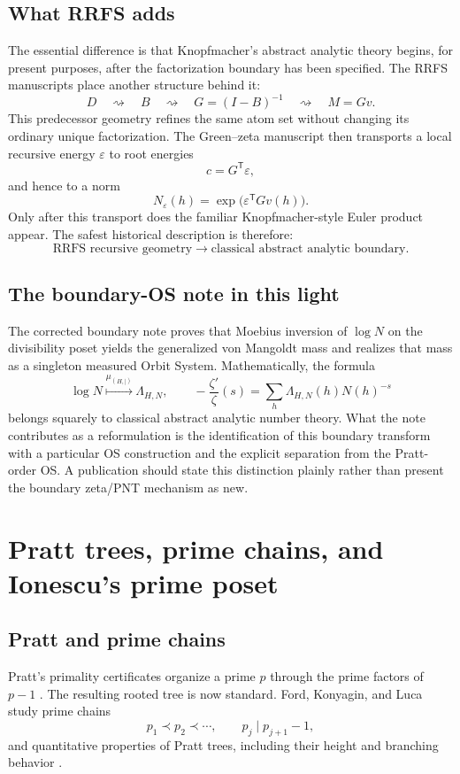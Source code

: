 \documentclass[11pt]{article}
\begin{document}
\subsection{What RRFS adds}
The essential difference is that Knopfmacher's abstract analytic theory begins, for present purposes, after the factorization boundary has been specified. The RRFS manuscripts place another structure behind it:
\[
 D\quad\rightsquigarrow\quad B\quad\rightsquigarrow\quad
 G=(I-B)^{-1}\quad\rightsquigarrow\quad M=Gv.
\]
This predecessor geometry refines the same atom set without changing its ordinary unique factorization. The Green--zeta manuscript then transports a local recursive energy $\varepsilon$ to root energies
\[
 c=G^{\mathsf T}\varepsilon,
\]
and hence to a norm
\[
 N_\varepsilon(h)=\exp\bigl(\varepsilon^{\mathsf T}Gv(h)\bigr).
\]
Only after this transport does the familiar Knopfmacher-style Euler product appear. The safest historical description is therefore:
\[
 \boxed{\text{RRFS recursive geometry}\longrightarrow
 \text{classical abstract analytic boundary}.}
\]

\subsection{The boundary-OS note in this light}
The corrected boundary note \cite{LekaBoundary} proves that Moebius inversion of $\log N$ on the divisibility poset yields the generalized von Mangoldt mass and realizes that mass as a singleton measured Orbit System. Mathematically, the formula
\[
 \log N\overset{\mu_{(H,\mid)}}{\longmapsto}\Lambda_{H,N},
 \qquad
 -\frac{\zeta'}{\zeta}(s)=\sum_h\Lambda_{H,N}(h)N(h)^{-s}
\]
belongs squarely to classical abstract analytic number theory. What the note contributes as a reformulation is the identification of this boundary transform with a particular OS construction and the explicit separation from the Pratt-order OS. A publication should state this distinction plainly rather than present the boundary zeta/PNT mechanism as new.

\section{Pratt trees, prime chains, and Ionescu's prime poset}
\subsection{Pratt and prime chains}
Pratt's primality certificates organize a prime $p$ through the prime factors of $p-1$ \cite{Pratt1975}. The resulting rooted tree is now standard. Ford, Konyagin, and Luca study prime chains
\[
 p_1\prec p_2\prec\cdots,\qquad p_j\mid p_{j+1}-1,
\]
and quantitative properties of Pratt trees, including their height and branching behavior \cite{FordKonyaginLuca2010}.
\end{document}
